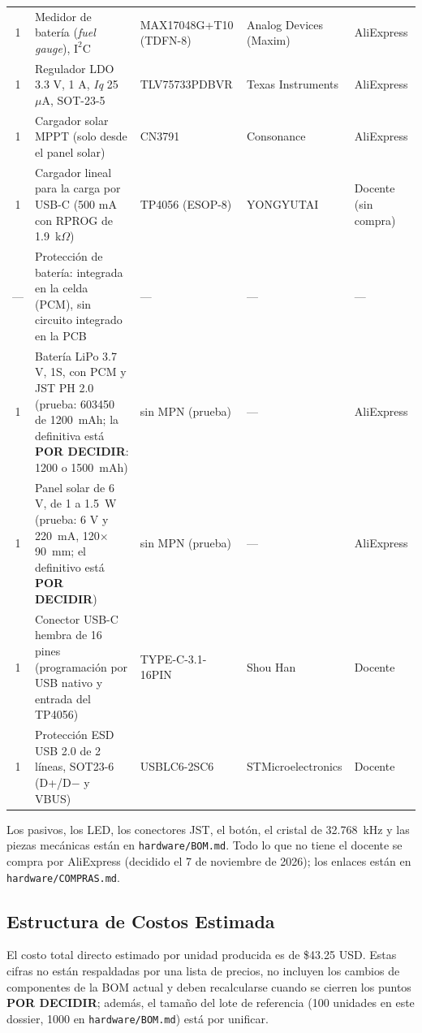 \begin{table}[H]
\begin{tabularx}{\textwidth}{c >{\raggedright\arraybackslash}X >{\raggedright\arraybackslash}X l l}
1 & Medidor de batería (\textit{fuel gauge}), $\text{I}^2\text{C}$ & MAX17048G+T10 (TDFN-8) & Analog Devices (Maxim) & AliExpress \\
\rowcolor{rowalt}
1 & Regulador LDO 3.3 V, 1 A, \textit{Iq} 25~$\mu$A, SOT-23-5 & TLV75733PDBVR & Texas Instruments & AliExpress \\
1 & Cargador solar MPPT (solo desde el panel solar) & CN3791 & Consonance & AliExpress \\
\rowcolor{rowalt}
1 & Cargador lineal para la carga por USB-C (500 mA con RPROG de 1.9~k$\Omega$) & TP4056 (ESOP-8) & YONGYUTAI & Docente (sin compra) \\
--- & Protección de batería: integrada en la celda (PCM), sin circuito integrado en la PCB & --- & --- & --- \\
\rowcolor{rowalt}
1 & Batería LiPo 3.7 V, 1S, con PCM y JST PH 2.0 (prueba: 603450 de 1200~mAh; la definitiva está \textbf{POR DECIDIR}: 1200 o 1500~mAh) & sin MPN (prueba) & --- & AliExpress \\
1 & Panel solar de 6 V, de 1 a 1.5~W (prueba: 6 V y 220~mA, 120$\times$90~mm; el definitivo está \textbf{POR DECIDIR}) & sin MPN (prueba) & --- & AliExpress \\
\rowcolor{rowalt}
1 & Conector USB-C hembra de 16 pines (programación por USB nativo y entrada del TP4056) & TYPE-C-3.1-16PIN & Shou Han & Docente \\
1 & Protección ESD USB 2.0 de 2 líneas, SOT23-6 (D+/D$-$ y VBUS) & USBLC6-2SC6 & STMicroelectronics & Docente \\
\bottomrule
\end{tabularx}
\end{table}

\noindent Los pasivos, los LED, los conectores JST, el botón, el cristal de 32.768~kHz y las piezas mecánicas están en \texttt{hardware/BOM.md}. Todo lo que no tiene el docente se compra por AliExpress (decidido el 7 de noviembre de 2026); los enlaces están en \texttt{hardware/COMPRAS.md}.

\subsection{Estructura de Costos Estimada}

El costo total directo estimado por unidad producida es de \$43.25 USD. Estas cifras no están respaldadas por una lista de precios, no incluyen los cambios de componentes de la BOM actual y deben recalcularse cuando se cierren los puntos \textbf{POR DECIDIR}; además, el tamaño del lote de referencia (100 unidades en este dossier, 1000 en \texttt{hardware/BOM.md}) está por unificar.

